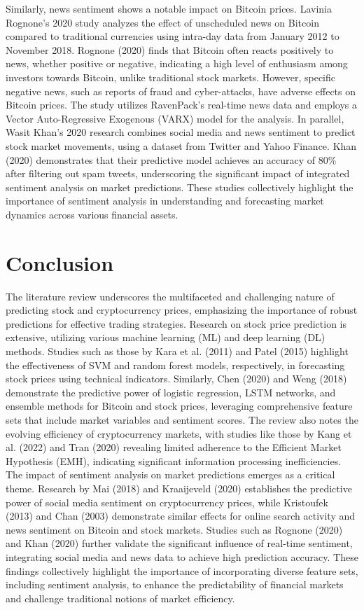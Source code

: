 Similarly, news sentiment shows a notable impact on Bitcoin prices. Lavinia Rognone's 2020 study analyzes the effect of unscheduled news on Bitcoin compared to traditional currencies using intra-day data from January 2012 to November 2018. Rognone (2020) finds that Bitcoin often reacts positively to news, whether positive or negative, indicating a high level of enthusiasm among investors towards Bitcoin, unlike traditional stock markets. However, specific negative news, such as reports of fraud and cyber-attacks, have adverse effects on Bitcoin prices. The study utilizes RavenPack's real-time news data and employs a Vector Auto-Regressive Exogenous (VARX) model for the analysis. In parallel, Wasit Khan's 2020 research combines social media and news sentiment to predict stock market movements, using a dataset from Twitter and Yahoo Finance. Khan (2020) demonstrates that their predictive model achieves an accuracy of 80\% after filtering out spam tweets, underscoring the significant impact of integrated sentiment analysis on market predictions. These studies collectively highlight the importance of sentiment analysis in understanding and forecasting market dynamics across various financial assets.

\section{Conclusion}
The literature review underscores the multifaceted and challenging nature of predicting stock and cryptocurrency prices, emphasizing the importance of robust predictions for effective trading strategies. Research on stock price prediction is extensive, utilizing various machine learning (ML) and deep learning (DL) methods. Studies such as those by Kara et al. (2011) and Patel (2015) highlight the effectiveness of SVM and random forest models, respectively, in forecasting stock prices using technical indicators. Similarly, Chen (2020) and Weng (2018) demonstrate the predictive power of logistic regression, LSTM networks, and ensemble methods for Bitcoin and stock prices, leveraging comprehensive feature sets that include market variables and sentiment scores. The review also notes the evolving efficiency of cryptocurrency markets, with studies like those by Kang et al. (2022) and Tran (2020) revealing limited adherence to the Efficient Market Hypothesis (EMH), indicating significant information processing inefficiencies.
The impact of sentiment analysis on market predictions emerges as a critical theme. Research by Mai (2018) and Kraaijeveld (2020) establishes the predictive power of social media sentiment on cryptocurrency prices, while Kristoufek (2013) and Chan (2003) demonstrate similar effects for online search activity and news sentiment on Bitcoin and stock markets. Studies such as Rognone (2020) and Khan (2020) further validate the significant influence of real-time sentiment, integrating social media and news data to achieve high prediction accuracy. These findings collectively highlight the importance of incorporating diverse feature sets, including sentiment analysis, to enhance the predictability of financial markets and challenge traditional notions of market efficiency.
